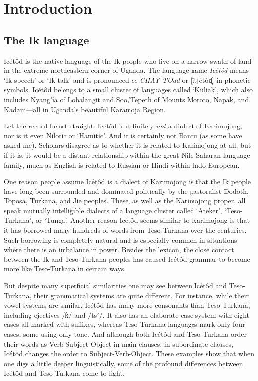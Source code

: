 
 


 

 
\chapter{Introduction} 
\section{The Ik language} 
Icétôd is the native language of the Ik people who live on a narrow swath of land in the extreme northeastern corner of Uganda. The language name \textit{Icétôd} means ‘Ik-speech’ or ‘Ik-talk’ and is pronounced \textit{ee-CHAY-TOad} or [\={i}tʃétôd̻] in phonetic symbols. Icétôd belongs to a small cluster of languages called ‘Kuliak’, which also includes Nyang’ía of Lobalangit and Soo/Tepeth of Mounts Moroto, Napak, and Kadam—all in Uganda’s beautiful Karamoja Region. 

Let the record be set straight: Icétôd is definitely \textit{not }a dialect of Karimojong, nor is it even Nilotic or ‘Hamitic’. And it is certainly not Bantu (as some have asked me). Scholars disagree as to whether it is related to Karimojong at all, but if it is, it would be a distant relationship within the great Nilo-Saharan language family, much as English is related to Russian or Hindi within Indo-European.

One reason people assume Icétôd is a dialect of Karimojong is that the Ik people have long been surrounded and dominated politically by the pastoralist Dodoth, Toposa, Turkana, and Jie peoples. These, as well as the Karimojong proper, all speak mutually intelligible dialects of a language cluster called ‘Ateker’, ‘Teso-Turkana’, or ‘Tunga’. Another reason Icétôd seems similar to Karimojong is that it has borrowed many hundreds of words from Teso-Turkana over the centuries. Such borrowing is completely natural and is especially common in situations where there is an imbalance in power. Besides the lexicon, the close contact between the Ik and Teso-Turkana peoples has caused Icétôd grammar to become more like Teso-Turkana in certain ways.

But despite many superficial similarities one may see between Icétôd and Teso-Turkana, their grammatical systems are quite different. For instance, while their vowel systems are similar, Icétôd has many more consonants than Teso-Turkana, including ejectives /ƙ/ and /tsʼ/. It also has an elaborate case system with eight cases all marked with suffixes, whereas Teso-Turkana languages mark only four cases, some using only tone. And although both Icétôd and Teso-Turkana order their words as Verb-Subject-Object in main clauses, in subordinate clauses, Icétôd changes the order to Subject-Verb-Object. These examples show that when one digs a little deeper linguistically, some of the profound differences between Icétôd and Teso-Turkana come to light. 

